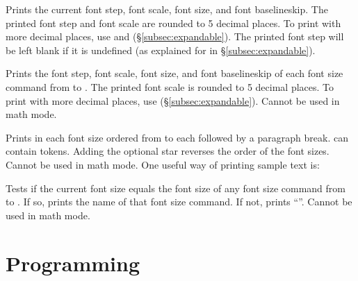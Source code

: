 \documentclass{beery}
\begin{document}
\begin{displaycode}
\end{displaycode}

Prints the current font step, font scale, font size, and font baselineskip.
The printed font step and font scale are rounded to \num{5} decimal places.
To print with more decimal places, use  and  (\S\ref{subsec:expandable}).
The printed font step will be left blank if it is undefined (as explained for  in \S\ref{subsec:expandable}).
\pagebreak%

\begin{displaycode}
\end{displaycode}

Prints the font step, font scale, font size, and font baselineskip of each font size command from  to .
The printed font scale is rounded to \num{5} decimal places.
To print with more decimal places, use  (\S\ref{subsec:expandable}).
Cannot be used in math mode.

\begin{displaycode}
   \sarg{} 
\end{displaycode}

Prints  in each font size ordered from  to  each followed by a paragraph break.
 can contain  tokens.
Adding the optional star \sarg{} reverses the order of the font sizes.
Cannot be used in math mode.
One useful way of printing sample text is:

\begin{verbatim*}
\printsampletext{\printfontsizecommand: \printfontsizeparameters}
\end{verbatim*}

\begin{displaycode}
\end{displaycode}

Tests if the current font size equals the font size of any font size command from  to .
If so, prints the name of that font size command.
If not, prints \enquote{\string\undefined}.
Cannot be used in math mode.


\section{Programming}
\label{sec:programming}
\end{document}
